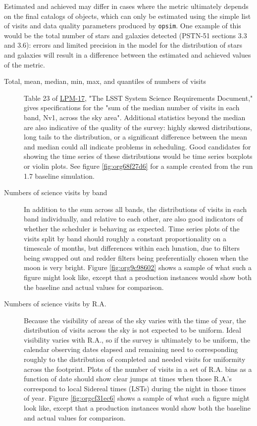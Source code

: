 Estimated and achieved may differ in cases where the metric ultimately depends on the final catalogs of objects, which can only be estimated using the simple list of visits and data quality parameters produced by \texttt{opsim}.
One example of this would be the total number of stars and galaxies detected (PSTN-51 sections 3.3 and 3.6): errors and limited precision in the model for the distribution of stars and galaxies will result in a difference between the estimated and achieved values of the metric.

\begin{description}
\item[{Total, mean, median, min, max, and quantiles of numbers of visits}] Table 23 of \href{http://ls.st/lpm-17}{LPM-17}, "The LSST System Science Requirements Document," gives specifications for the "sum of the median number of visits in each band, Nv1, across the sky area". Additional statistics beyond the median are also indicative of the quality of the survey: highly skewed distributions, long tails to the distribution, or a significant difference between the mean and median could all indicate problems in scheduling. Good candidates for showing the time series of these distributions would be time series boxplots or violin plots. See figure \ref{fig:org68f27d6} for a sample created from the run 1.7 baseline simulation.
\item[{Numbers of science visits by band}] In addition to the sum across all bands, the distributions of visits in each band individually, and relative to each other, are also good indicators of whether the scheduler is behaving as expected. Time series plots of the visits split by band should roughly a constant proportionality on a timescale of months, but differences within each lunation, due to filters being swapped out and redder filters being preferentially chosen when the moon is very bright. Figure \ref{fig:org9c98602} shows a sample of what such a figure might look like, except that a production instances would show both the baseline and actual values for comparison.
\item[{Numbers of science visits by R.A.}] Because the visibility of areas of the sky varies with the time of year, the distribution of visits across the sky is not expected to be uniform. Ideal visibility varies with R.A., so if the survey is ultimately to be uniform, the calendar observing dates elapsed and remaining need to corresponding roughly to the distribution of completed and needed visits for uniformity across the footprint. Plots of the number of visits in a set of R.A. bins as a function of date should show clear jumps at times when those R.A.'s correspond to local Sidereal times (LSTs) during the night in those times of year. Figure \ref{fig:orgcf31ec6} shows a sample of what such a figure might look like, except that a production instances would show both the baseline and actual values for comparison.

\end{description}
